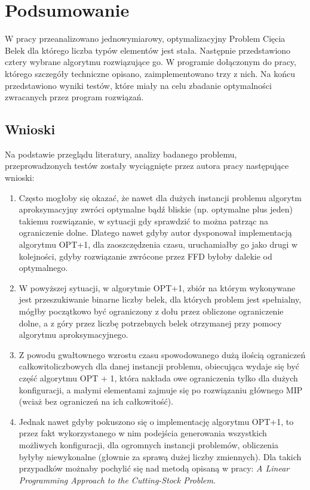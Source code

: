 \chapter{Podsumowanie} \label{ch:SUMMARY}
\thispagestyle{chapterBeginStyle}

W pracy przeanalizowano jednowymiarowy, optymalizacyjny Problem Cięcia Belek dla którego liczba typów elementów jest stała. 
Następnie przedstawiono cztery wybrane algorytmu rozwiązujące go. W programie dołączonym do pracy, którego szczegóły techniczne opisano, zaimplementowano trzy z nich. Na końcu przedstawiono wyniki testów, które miały na celu zbadanie optymalności zwracanych przez program rozwiązań.

\section{Wnioski}
Na podstawie przeglądu literatury, analizy badanego problemu, przeprowadzonych testów zostały wyciągnięte  przez autora pracy następujące wnioski:
\begin{enumerate}
	\item Często mogłoby się okazać, że nawet dla dużych instancji problemu algorytm aproksymacyjny zwróci optymalne bądź bliskie (np. optymalne plus jeden) takiemu rozwiązanie, w sytuacji gdy sprawdzić to można patrząc na ograniczenie dolne. Dlatego nawet gdyby autor dysponował implementacją algorytmu OPT+1, dla zaoszczędzenia czasu, uruchamiałby go jako drugi w kolejności, gdyby rozwiązanie zwrócone przez FFD byłoby dalekie od optymalnego.
	\item W powyższej sytuacji, w algorytmie OPT+1, zbiór na którym wykonywane jest przeszukiwanie binarne liczby belek, dla których problem jest spełnialny, mógłby początkowo być ograniczony z dołu przez obliczone ograniczenie dolne, a z góry przez liczbę potrzebnych belek otrzymanej przy pomocy algorytmu aproksymacyjnego.
	\item Z powodu gwałtownego wzrostu czasu spowodowanego dużą ilością ograniczeń całkowitoliczbowych dla danej instancji problemu, obiecująca wydaje się być część algorytmu OPT + 1, która nakłada owe ograniczenia tylko dla dużych konfiguracji, a małymi elementami zajmuje się po rozwiązaniu głównego MIP (wciaż bez ograniczeń na ich całkowitość).
	\item Jednak nawet gdyby pokuszono się o implementację algorytmu OPT+1, to przez fakt wykorzystanego w nim podejścia generowania wszystkich możliwych konfiguracji, dla ogromnych instancji problemów, obliczenia byłyby niewykonalne (głownie za sprawą dużej liczby zmiennych). Dla takich przypadków możnaby pochylić się nad metodą opisaną w pracy: \textit{A Linear Programming Approach to the Cutting-Stock Problem}\cite{GOMORY}.

\end{enumerate}

